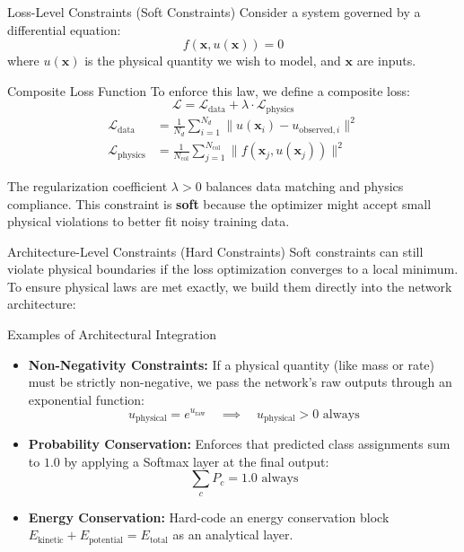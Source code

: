 \documentclass[9pt]{beamer}
\begin{document}
\begin{frame}{Loss-Level Constraints (Soft Constraints)}
  Consider a system governed by a differential equation:
  $$f(\mathbf{x}, u(\mathbf{x})) = 0$$
  where $u(\mathbf{x})$ is the physical quantity we wish to model, and $\mathbf{x}$ are inputs.
  \begin{block}{Composite Loss Function}
    To enforce this law, we define a composite loss:
    $$\mathcal{L} = \mathcal{L}_{\text{data}} + \lambda \cdot \mathcal{L}_{\text{physics}}$$
    \begin{align*}
      \mathcal{L}_{\text{data}} &= \frac{1}{N_d} \sum_{i=1}^{N_d} \|u(\mathbf{x}_i) - u_{\text{observed}, i}\|^2 \\
      \mathcal{L}_{\text{physics}} &= \frac{1}{N_{\text{col}}} \sum_{j=1}^{N_{\text{col}}} \|f(\mathbf{x}_j, u(\mathbf{x}_j))\|^2
    \end{align*}
  \end{block}
  The regularization coefficient $\lambda > 0$ balances data matching and physics compliance. This constraint is \textbf{soft} because the optimizer might accept small physical violations to better fit noisy training data.
\end{frame}

\begin{frame}{Architecture-Level Constraints (Hard Constraints)}
  Soft constraints can still violate physical boundaries if the loss optimization converges to a local minimum. To ensure physical laws are met exactly, we build them directly into the network architecture:
  \begin{block}{Examples of Architectural Integration}
    \begin{itemize}
      \item \textbf{Non-Negativity Constraints:} If a physical quantity (like mass or rate) must be strictly non-negative, we pass the network's raw outputs through an exponential function:
        $$u_{\text{physical}} = e^{u_{\text{raw}}} \quad \implies \quad u_{\text{physical}} > 0 \text{ always}$$
      \item \textbf{Probability Conservation:} Enforces that predicted class assignments sum to $1.0$ by applying a Softmax layer at the final output:
        $$\sum_c P_c = 1.0 \text{ always}$$
      \item \textbf{Energy Conservation:} Hard-code an energy conservation block $E_{\text{kinetic}} + E_{\text{potential}} = E_{\text{total}}$ as an analytical layer.
    \end{itemize}
  \end{block}
\end{frame}
\end{document}
